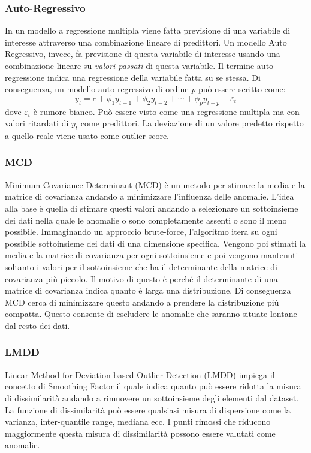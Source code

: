 \subsubsection{Auto-Regressivo}
In un modello a regressione multipla viene fatta previsione di una variabile di interesse attraverso una combinazione lineare di predittori. Un modello Auto Regressivo, invece, fa previsione di questa variabile di interesse usando una combinazione lineare su \textit{valori passati} di questa variabile. Il termine auto-regressione indica una regressione della variabile fatta su se stessa.
Di conseguenza, un modello auto-regressivo di ordine \textit{p} può essere scritto come:
\[y_t=c+\phi_1 y_{t-1}+\phi_2 y_{t-2}+\cdots+\phi_p y_{t-p}+\varepsilon_t\]
dove $\varepsilon_t$ è rumore bianco. Può essere visto come una regressione multipla ma con valori ritardati di $y_t$ come predittori. 
La deviazione di un valore predetto rispetto a quello reale viene usato come outlier score.

\subsubsection{MCD}
Minimum Covariance Determinant (MCD) \cite{rousseeuw1999fast, hardin2004outlier} è un metodo per stimare la media e la matrice di covarianza andando a minimizzare l'influenza delle anomalie. L'idea alla base è quella di stimare questi valori andando a selezionare un sottoinsieme dei dati nella quale le anomalie o sono completamente assenti o sono il meno possibile.
Immaginando un approccio brute-force, l'algoritmo itera su ogni possibile sottoinsieme dei dati di una dimensione specifica. Vengono poi stimati la media e la matrice di covarianza per ogni sottoinsieme e poi vengono mantenuti soltanto i valori per il sottoinsieme che ha il determinante della matrice di covarianza più piccolo. Il motivo di questo è perché il determinante di una matrice di covarianza indica quanto è larga una distribuzione. Di conseguenza MCD cerca di minimizzare questo andando a prendere la distribuzione più compatta. Questo consente di escludere le anomalie che saranno situate lontane dal resto dei dati.

\subsubsection{LMDD}
Linear Method for Deviation-based Outlier Detection (LMDD) \cite{arning1996linear} impiega il concetto di Smoothing Factor il quale indica quanto può essere ridotta la misura di dissimilarità andando a rimuovere un sottoinsieme degli elementi dal dataset. La funzione di dissimilarità può essere qualsiasi misura di dispersione come la varianza, inter-quantile range, mediana ecc.
I punti rimossi che riducono maggiormente questa misura di dissimilarità possono essere valutati come anomalie.

